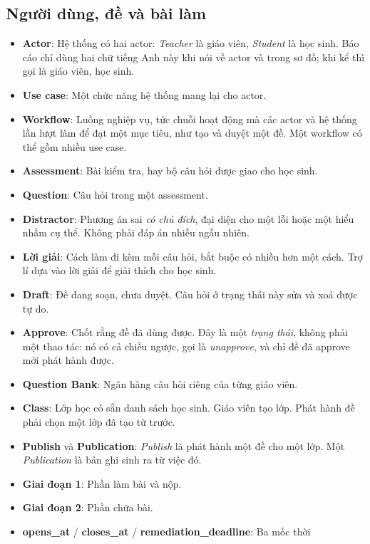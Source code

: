 \subsection{Người dùng, đề và bài làm}

\begin{itemize}
  \item \textbf{Actor}: Hệ thống có hai actor: \emph{Teacher} là giáo viên, \emph{Student} là học sinh.
        Báo cáo chỉ dùng hai chữ tiếng Anh này khi nói về actor và trong sơ đồ; khi kể thì gọi là giáo viên, học sinh.
  \item \textbf{Use case}: Một chức năng hệ thống mang lại cho actor.
  \item \textbf{Workflow}: Luồng nghiệp vụ, tức chuỗi hoạt động mà các actor và hệ thống lần lượt
        làm để đạt một mục tiêu, như tạo và duyệt một đề. Một workflow có thể gồm nhiều use case.
  \item \textbf{Assessment}: Bài kiểm tra, hay bộ câu hỏi được giao cho học sinh.
  \item \textbf{Question}: Câu hỏi trong một assessment.
  \item \textbf{Distractor}: Phương án sai \emph{có chủ đích}, đại diện cho một lỗi hoặc một hiểu nhầm cụ
        thể. Không phải đáp án nhiễu ngẫu nhiên.
  \item \textbf{Lời giải}: Cách làm đi kèm mỗi câu hỏi, bắt buộc có nhiều hơn một cách. Trợ lí
        dựa vào lời giải để giải thích cho học sinh.
  \item \textbf{Draft}: Đề đang soạn, chưa duyệt. Câu hỏi ở trạng thái này sửa và xoá được tự do.
  \item \textbf{Approve}: Chốt rằng đề đã dùng được. Đây là một \emph{trạng thái}, không phải một
        thao tác: nó có cả chiều ngược, gọi là \emph{unapprove}, và chỉ đề đã approve mới phát hành
        được.
  \item \textbf{Question Bank}: Ngân hàng câu hỏi riêng của từng giáo viên.
  \item \textbf{Class}: Lớp học có sẵn danh sách học sinh. Giáo viên tạo lớp. Phát hành đề phải
        chọn một lớp đã tạo từ trước.
  \item \textbf{Publish} và \textbf{Publication}: \emph{Publish} là phát hành một đề cho một lớp. Một
        \emph{Publication} là bản ghi sinh ra từ việc đó.
  \item \textbf{Giai đoạn 1}: Phần làm bài và nộp.
  \item \textbf{Giai đoạn 2}: Phần chữa bài.
  \item \textbf{opens\_at} / \textbf{closes\_at} / \textbf{remediation\_deadline}: Ba mốc thời

\end{itemize}
